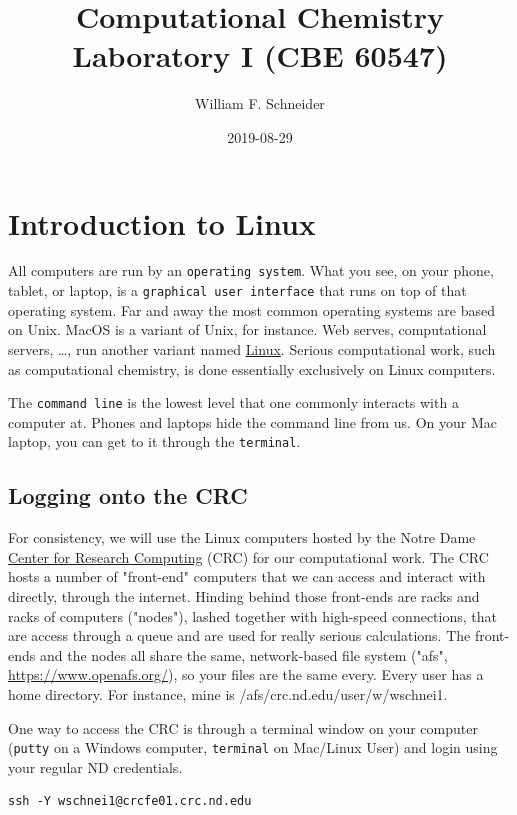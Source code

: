 \documentclass[11pt]{article}
\author{William F. Schneider}
\date{2019-08-29}
\title{Computational Chemistry Laboratory I (CBE 60547)}
\begin{document}
\maketitle

\section{Introduction to Linux}
\label{sec:orgcb91b0b}

All computers are run by an \texttt{operating system}.  What you see, on your phone, tablet, or
laptop, is a \texttt{graphical user interface} that runs on top of that operating system.  Far
and away the most common operating systems are based on Unix.  MacOS is a variant of Unix,
for instance. Web serves, computational servers, \ldots{}, run another variant named \href{https://www.linux.org/}{Linux}.
Serious computational work, such as computational chemistry, is done essentially
exclusively on Linux computers.

The \texttt{command line} is the lowest level that one commonly interacts with a computer at.
Phones and laptops hide the command line from us. On your Mac laptop, you can get to it
through the \texttt{terminal}.

\subsection{Logging onto the CRC}
\label{sec:orgae8b5ca}
For consistency, we will use the Linux computers hosted by the Notre Dame \href{http://crc.nd.edu}{Center for
Research Computing} (CRC) for our computational work. The CRC hosts a number of "front-end"
computers that we can access and interact with directly, through the internet.  Hinding
behind those front-ends are racks and racks of computers ("nodes"), lashed together with
high-speed connections, that are access through a queue and are used for really serious
calculations.  The front-ends and the nodes all share the same, network-based file system
("afs", \url{https://www.openafs.org/}), so your files are the same every.  Every user has a
home directory.  For instance, mine is /afs/crc.nd.edu/user/w/wschnei1.  

One way to access the CRC is through a terminal window on your computer (\texttt{putty} on a
Windows computer, \texttt{terminal} on Mac/Linux User) and login using your regular ND
credentials.

\begin{verbatim}
ssh -Y wschnei1@crcfe01.crc.nd.edu
\end{verbatim}
\end{document}
